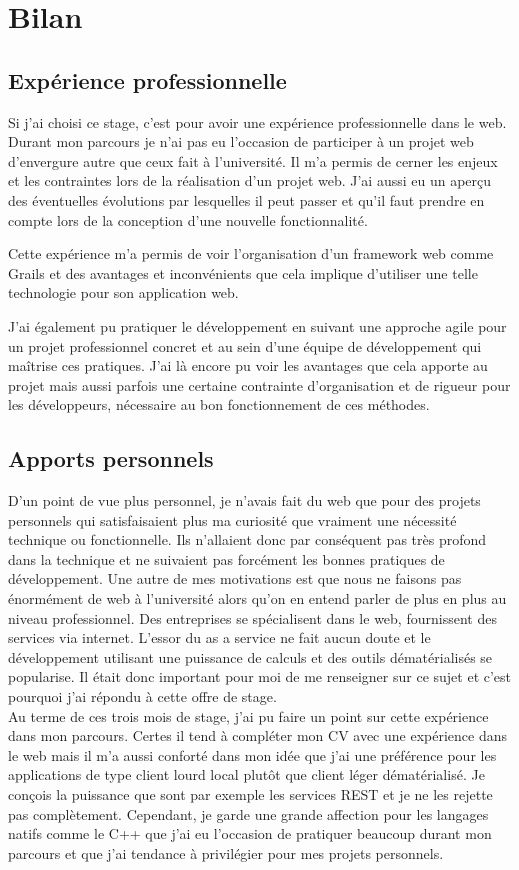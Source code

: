 \chapter{Bilan}

\section{Expérience professionnelle}
Si j'ai choisi ce stage, c'est pour avoir une expérience professionnelle dans le
web. Durant mon parcours je n'ai pas eu l'occasion de participer à un projet web
d'envergure autre que ceux fait à l'université. Il m'a permis de cerner les
enjeux et les contraintes lors de la réalisation d'un projet web. J'ai aussi eu
un aperçu des éventuelles évolutions par lesquelles il peut passer et qu'il faut
prendre en compte lors de la conception d'une nouvelle fonctionnalité.

Cette expérience m'a permis de voir l'organisation d'un framework web comme
Grails et des avantages et inconvénients que cela implique d'utiliser une telle
technologie pour son application web.

J'ai également pu pratiquer le développement en suivant une approche agile pour
un projet professionnel concret et au sein d'une équipe de développement qui
maîtrise ces pratiques. J'ai là encore pu voir les avantages que cela apporte au
projet mais aussi parfois une certaine contrainte d'organisation et de rigueur
pour les développeurs, nécessaire au bon fonctionnement de ces méthodes.

\section{Apports personnels}
D'un point de vue plus personnel, je n'avais fait du web que pour des projets
personnels qui satisfaisaient plus ma curiosité que vraiment une nécessité
technique ou fonctionnelle. Ils n'allaient donc par conséquent pas très profond
dans la technique et ne suivaient pas forcément les bonnes pratiques de
développement. Une autre de mes motivations est que nous ne faisons pas
énormément de web à l'université alors qu'on en entend parler de plus en plus au
niveau professionnel. Des entreprises se spécialisent dans le web, fournissent
des services via internet. L'essor du \og as a service \fg{} ne fait aucun doute
et le développement utilisant une puissance de calculs et des outils
dématérialisés se popularise. Il était donc important pour moi de me renseigner
sur ce sujet et c'est pourquoi j'ai répondu à cette offre de stage.\\

Au terme de ces trois mois de stage, j'ai pu faire un point sur cette expérience
dans mon parcours. Certes il tend à compléter mon CV avec une expérience dans le
web mais il m'a aussi conforté dans mon idée que j'ai une préférence pour les
applications de type client lourd local plutôt que client léger dématérialisé. Je
conçois la puissance que sont par exemple les services REST et je ne les
rejette pas complètement. Cependant, je garde une grande affection pour les
langages natifs comme le C++ que j'ai eu l'occasion de pratiquer beaucoup durant
mon parcours et que j'ai tendance à privilégier pour mes projets personnels.


